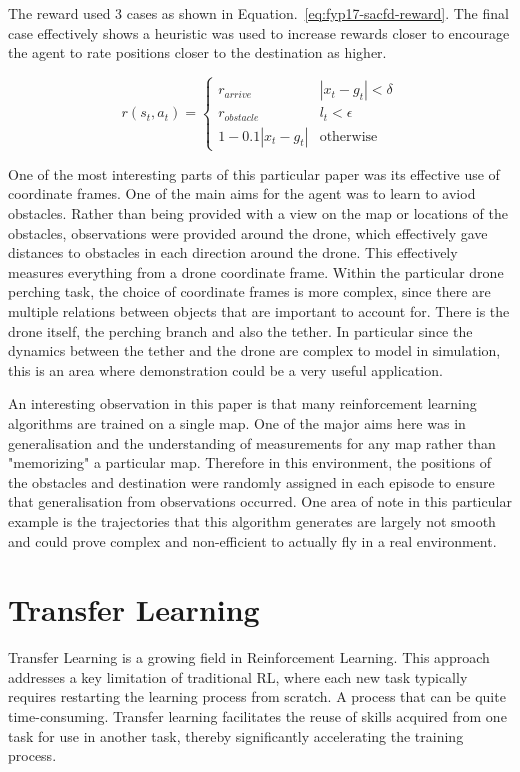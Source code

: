 The reward used 3 cases as shown in Equation.~\ref*{eq:fyp17-sacfd-reward}. 
The final case effectively shows a heuristic was used to increase rewards closer to encourage the agent to rate positions closer to the destination as higher.

\begin{equation}
  r(s_{t}, a_{t}) =
  \begin{cases} 
    r_{arrive} & |x_{t} - g_{t}| < \delta \\
    r_{obstacle} & l_{t} < \epsilon \\
    1-0.1 |x_{t} - g_{t}| & \text{otherwise}
  \end{cases}
  \label{eq:fyp17-sacfd-reward}
\end{equation}

One of the most interesting parts of this particular paper was its effective use of coordinate frames.
One of the main aims for the agent was to learn to aviod obstacles.
Rather than being provided with a view on the map or locations of the obstacles, observations were provided around the drone, which effectively gave distances to obstacles in each direction around the drone.
This effectively measures everything from a drone coordinate frame.
Within the particular drone perching task, the choice of coordinate frames is more complex, since there are multiple relations between objects that are important to account for.
There is the drone itself, the perching branch and also the tether.
In particular since the dynamics between the tether and the drone are complex to model in simulation, this is an area where demonstration could be a very useful application.

An interesting observation in this paper is that many reinforcement learning algorithms are trained on a single map.
One of the major aims here was in generalisation and the understanding of measurements for any map rather than "memorizing" a particular map.
Therefore in this environment, the positions of the obstacles and destination were randomly assigned in each episode to ensure that generalisation from observations occurred.
One area of note in this particular example is the trajectories that this algorithm generates are largely not smooth and could prove complex and non-efficient to actually fly in a real environment.



\section{Transfer Learning}
Transfer Learning is a growing field in Reinforcement Learning.
This approach addresses a key limitation of traditional RL, where each new task typically requires restarting the learning process from scratch.
A process that can be quite time-consuming. 
Transfer learning facilitates the reuse of skills acquired from one task for use in another task, thereby significantly accelerating the training process.

